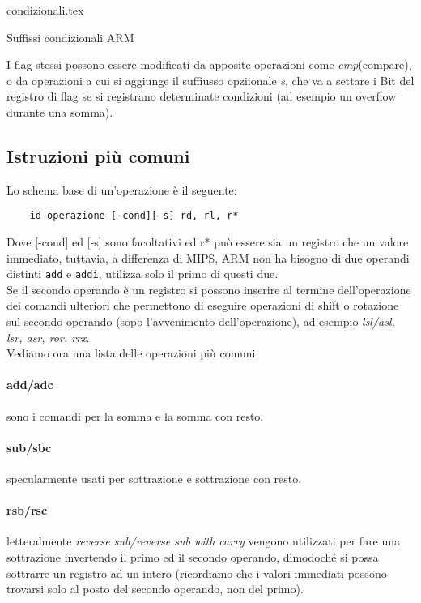 \documentclass[class=book, crop=false, oneside]{standalone}
\begin{document}
\begin{table}[H]
	\centering
	{condizionali.tex}
	\caption*{Suffissi condizionali ARM}
\end{table}

I flag stessi possono essere modificati da apposite operazioni come \emph{cmp}(compare), o da operazioni a cui si aggiunge il suffiusso opziionale \emph{s}, che va a settare i Bit del registro di flag se si registrano determinate condizioni (ad esempio un overflow durante una somma).\\

\subsection*{Istruzioni più comuni}
Lo schema base di un'operazione è il seguente:

\begin{verbatim}
	id operazione [-cond][-s] rd, rl, r*
\end{verbatim}

Dove [-cond] ed [-s] sono facoltativi ed r* può essere sia un registro che un valore immediato, tuttavia, a differenza di MIPS, ARM non ha bisogno di due operandi distinti \texttt{add} e \texttt{addi}, utilizza solo il primo di questi due.\\
Se il secondo operando è un registro si possono inserire al termine dell'operazione dei comandi ulteriori che permettono di eseguire operazioni di shift o rotazione sul secondo operando (sopo l'avvenimento dell'operazione), ad esempio \emph{lsl/asl, lsr, asr, ror, rrx}.\\
Vediamo ora una lista delle operazioni più comuni:
\paragraph*{add/adc} sono i comandi per la somma e la somma con resto.
\paragraph{sub/sbc} specularmente usati per sottrazione e sottrazione con resto.
\paragraph*{rsb/rsc} letteralmente \emph{reverse sub/reverse sub with carry} vengono utilizzati per fare una sottrazione invertendo il primo ed il secondo operando, dimodoché si possa sottrarre un registro ad un intero (ricordiamo che i valori immediati possono trovarsi solo al posto del secondo operando, non del primo).
\end{document}
